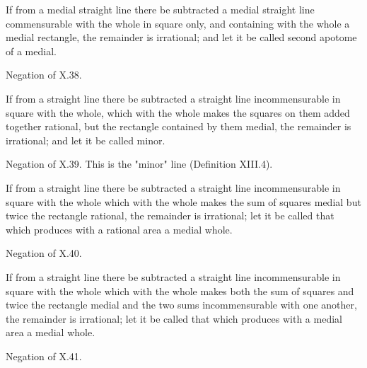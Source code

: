 \begin{claim}
\label{prop:X.75}
If from a medial straight line there be subtracted a medial straight
line commensurable with the whole in square only, and containing
with the whole a medial rectangle, the remainder is irrational; and
let it be called second apotome of a medial.
\end{claim}
\begin{evidence}[Proof of X.75]
\label{ev:X.75}
Negation of X.38.
\end{evidence}

\begin{claim}
\label{prop:X.76}
If from a straight line there be subtracted a straight line
incommensurable in square with the whole, which with the whole makes
the squares on them added together rational, but the rectangle
contained by them medial, the remainder is irrational; and let it
be called minor.
\end{claim}
\begin{evidence}[Proof of X.76]
\label{ev:X.76}
Negation of X.39.  This is the "minor" line (Definition XIII.4).
\end{evidence}

\begin{claim}
\label{prop:X.77}
If from a straight line there be subtracted a straight line
incommensurable in square with the whole which with the whole makes
the sum of squares medial but twice the rectangle rational, the
remainder is irrational; let it be called that which produces with
a rational area a medial whole.
\end{claim}
\begin{evidence}[Proof of X.77]
\label{ev:X.77}
Negation of X.40.
\end{evidence}

\begin{claim}
\label{prop:X.78}
If from a straight line there be subtracted a straight line
incommensurable in square with the whole which with the whole makes
both the sum of squares and twice the rectangle medial and the two
sums incommensurable with one another, the remainder is irrational;
let it be called that which produces with a medial area a medial
whole.
\end{claim}
\begin{evidence}[Proof of X.78]
\label{ev:X.78}
Negation of X.41.
\end{evidence}

